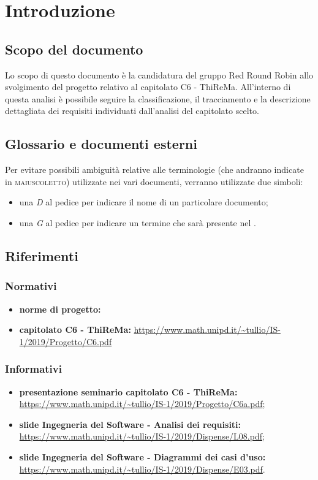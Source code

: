 \section{Introduzione}
	\subsection{Scopo del documento}
		Lo scopo di questo documento è la candidatura del gruppo Red Round Robin allo svolgimento del progetto relativo al capitolato C6 - ThiReMa.
		All'interno di questa analisi è  possibile seguire la classificazione, il tracciamento e la descrizione dettagliata dei requisiti individuati dall'analisi del capitolato scelto.
	\subsection{Glossario e documenti esterni}
		Per evitare possibili ambiguità relative alle terminologie (che andranno indicate in \textsc{maiuscoletto}) utilizzate nei vari documenti, verranno utilizzate due simboli:
		\begin{itemize}
			\item una \textit{D} al pedice per indicare il nome di un particolare documento;
			\item una \textit{G} al pedice per indicare un termine che sarà presente nel .
		\end{itemize}
	\subsection{Riferimenti}
		\subsubsection{Normativi}
			\begin{itemize}
				\item \textbf{norme di progetto: } 
				\item \textbf{capitolato C6 - ThiReMa: }\url{https://www.math.unipd.it/~tullio/IS-1/2019/Progetto/C6.pdf}
			\end{itemize}
		\subsubsection{Informativi}
			\begin{itemize}
				\item \textbf{presentazione seminario capitolato C6 - ThiReMa: }\url{https://www.math.unipd.it/~tullio/IS-1/2019/Progetto/C6a.pdf};
				\item \textbf{slide Ingegneria del Software - Analisi dei requisiti: }\url{https://www.math.unipd.it/~tullio/IS-1/2019/Dispense/L08.pdf};
				\item \textbf{slide Ingegneria del Software - Diagrammi dei casi d'uso: }\url{https://www.math.unipd.it/~tullio/IS-1/2019/Dispense/E03.pdf}.
			\end{itemize}
